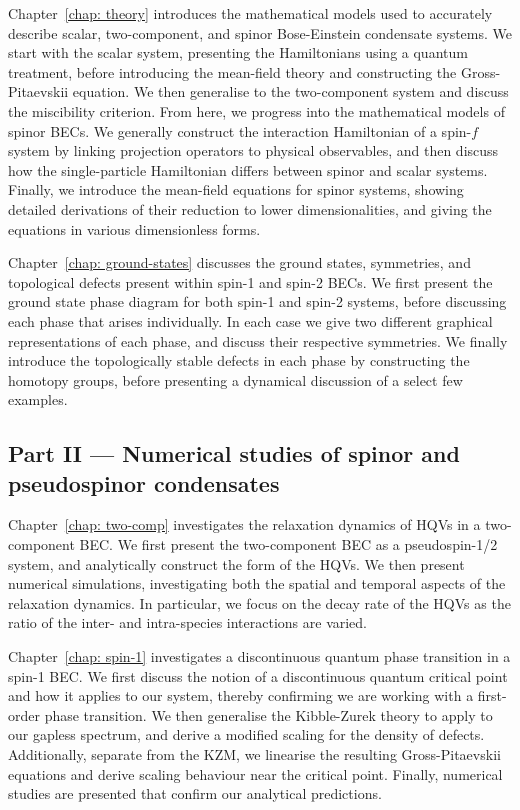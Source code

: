 Chapter~\ref{chap: theory} introduces the mathematical models used to accurately
describe scalar, two-component, and spinor Bose-Einstein condensate systems.
We start with the scalar system, presenting the Hamiltonians using a quantum
treatment, before introducing the mean-field theory and constructing the
Gross-Pitaevskii equation.
We then generalise to the two-component system and discuss the miscibility
criterion.
From here, we progress into the mathematical models of spinor BECs.
We generally construct the interaction Hamiltonian of a spin-\(f\) system by
linking projection operators to physical observables, and then discuss how the
single-particle Hamiltonian differs between spinor and scalar systems.
Finally, we introduce the mean-field equations for spinor systems, showing
detailed derivations of their reduction to lower dimensionalities, and giving
the equations in various dimensionless forms.

Chapter~\ref{chap: ground-states} discusses the ground states, symmetries, and
topological defects present within spin-1 and spin-2 BECs.
We first present the ground state phase diagram for both spin-1 and spin-2
systems, before discussing each phase that arises individually.
In each case we give two different graphical representations of each phase, and
discuss their respective symmetries.
We finally introduce the topologically stable defects in each phase by
constructing the homotopy groups, before presenting a dynamical discussion of
a select few examples.

\subsection*{Part II --- Numerical studies of spinor and pseudospinor
    condensates}
Chapter~\ref{chap: two-comp} investigates the relaxation dynamics of HQVs in a
two-component BEC\@.
We first present the two-component BEC as a pseudospin-1/2 system, and
analytically construct the form of the HQVs.
We then present numerical simulations, investigating both the spatial and
temporal aspects of the relaxation dynamics.
In particular, we focus on the decay rate of the HQVs as the ratio of the inter-
and intra-species interactions are varied.

Chapter~\ref{chap: spin-1} investigates a discontinuous quantum phase
transition in a spin-1 BEC\@.
We first discuss the notion of a discontinuous quantum critical point and how it
applies to our system, thereby confirming we are working with a first-order
phase transition.
We then generalise the Kibble-Zurek theory to apply to our gapless spectrum,
and derive a modified scaling for the density of defects.
Additionally, separate from the KZM, we linearise the resulting Gross-Pitaevskii
equations and derive scaling behaviour near the critical point.
Finally, numerical studies are presented that confirm our analytical
predictions.

